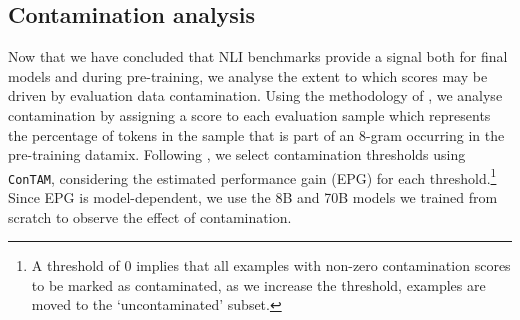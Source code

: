 \subsection{Contamination analysis}\label{subsec:contamination}

Now that we have concluded that NLI benchmarks provide a signal both for final models and during pre-training, we analyse the extent to which scores may be driven by evaluation data contamination.
Using the methodology of \citet{dubey2024llama}, we analyse contamination by assigning a score to each evaluation sample which represents the percentage of tokens in the sample that is part of an 8-gram occurring in the pre-training datamix.
Following \citet{singh2024evaluationdatacontaminationllms}, we select contamination thresholds using \texttt{ConTAM}, considering the estimated performance gain (EPG) for each threshold.\footnote{A threshold of 0 implies that all examples with non-zero contamination scores to be marked as contaminated, as we increase the threshold, examples are moved to the `uncontaminated' subset.}
Since EPG is model-dependent, we use the 8B and 70B models we trained from scratch to observe the effect of contamination. 

